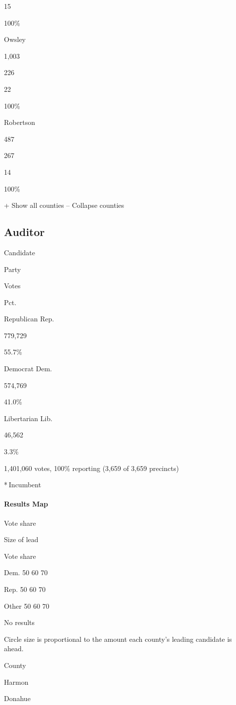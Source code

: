 15

100\%

Owsley

1,003

226

22

100\%

Robertson

487

267

14

100\%

+ Show all counties -- Collapse counties

\hypertarget{auditor}{%
\subsection{Auditor}\label{auditor}}

Candidate

Party

Votes

Pct.

Republican Rep.

779,729

55.7\%

Democrat Dem.

574,769

41.0\%

Libertarian Lib.

46,562

3.3\%

1,401,060 votes, 100\% reporting (3,659 of 3,659 precincts)

* Incumbent

\hypertarget{results-map-3}{%
\paragraph{Results Map}\label{results-map-3}}

Vote share

Size of lead

Vote share

Dem. 50 60 70

Rep. 50 60 70

Other 50 60 70

No results

Circle size is proportional to the amount each county's leading
candidate is ahead.

County

Harmon

Donahue

